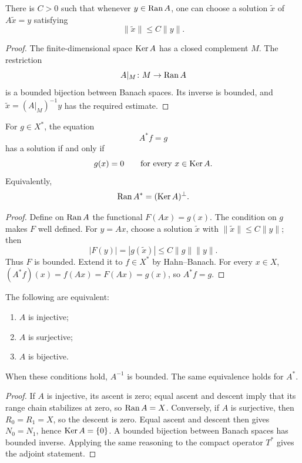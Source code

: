 \begin{notelemma}
There is $C>0$ such that whenever $y\in\operatorname{Ran} A$, one can choose a solution
$\widetilde x$ of $A\widetilde x=y$ satisfying
\[
  \|\widetilde x\|\le C\|y\|.
\]
\end{notelemma}

\begin{proof}
The finite-dimensional space $\operatorname{Ker} A$ has a closed complement $M$.  The
restriction
\[
  A|_M\colon M\to\operatorname{Ran} A
\]
is a bounded bijection between Banach spaces.  Its inverse is bounded, and
$\widetilde x=(A|_M)^{-1}y$ has the required estimate.
\end{proof}

\begin{notetheorem}
For $g\in X^*$, the equation
\[
  A^*f=g
\]
has a solution if and only if
\[
  g(x)=0
  \qquad\text{for every }x\in\operatorname{Ker} A.
\]
Equivalently,
\[
  \operatorname{Ran} A^*=(\operatorname{Ker} A)^\perp.
\]
\end{notetheorem}

\begin{proof}
Define on $\operatorname{Ran} A$ the functional $F(Ax)=g(x)$.  The condition on $g$
makes $F$ well defined.  For $y=Ax$, choose a solution $\widetilde x$ with
$\|\widetilde x\|\le C\|y\|$; then
\[
  |F(y)|=|g(\widetilde x)|\le C\|g\|\|y\|.
\]
Thus $F$ is bounded.  Extend it to $f\in X^*$ by Hahn--Banach.  For every
$x\in X$,
$(A^*f)(x)=f(Ax)=F(Ax)=g(x)$, so $A^*f=g$.
\end{proof}

\begin{notetheorem}
The following are equivalent:
\begin{enumerate}
  \item $A$ is injective;
  \item $A$ is surjective;
  \item $A$ is bijective.
\end{enumerate}
When these conditions hold, $A^{-1}$ is bounded.  The same equivalence holds
for $A^*$.
\end{notetheorem}

\begin{proof}
If $A$ is injective, its ascent is zero; equal ascent and descent imply that
its range chain stabilizes at zero, so $\operatorname{Ran} A=X$.  Conversely, if $A$ is
surjective, then $R_0=R_1=X$, so the descent is zero.  Equal ascent and descent
then gives $N_0=N_1$, hence $\operatorname{Ker} A=\{0\}$.  A bounded bijection between
Banach spaces has bounded inverse.  Applying the same reasoning to the compact
operator $T^*$ gives the adjoint statement.
\end{proof}


